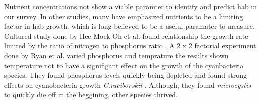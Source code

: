 Nutrient concentrations not show a viable paramter to identify and predict \gls{hab} in our survey. In other studies, many have emphasized nutrients to be a limiting factor in \gls{hab} growth.  which is long believed to be a useful paramater to measure. Cultured study done by Hee-Mock Oh et al. found relationship the growth rate limited by the ratio of nitrogen to phosphorus ratio \cite{oh_microcystin_2000}.  A 2 x 2 factorial experiment done by Ryan et al. varied phosphorus and temprature the results shown temperature not to have a signifigant effect on the growth of the cyanbacteria species. They found phosphorus levels quickly being depleted and found strong effects on cyanobacteria growth  \emph{C.raciborskii} \cite{ryan_effects_2017}. Although, they found \emph{microcystis} to quickly die off in the beggining, other species thrived.








